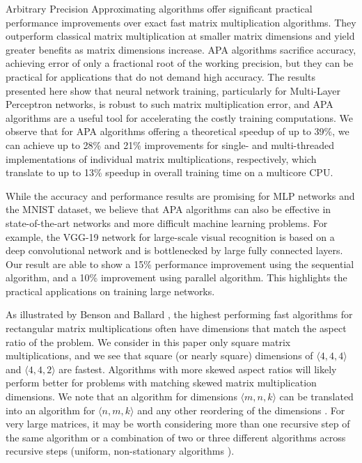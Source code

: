 \documentclass[manuscript]{acmart}
\newcommand{\dims}[1]{\langle #1 \rangle}
\begin{document}
Arbitrary Precision Approximating algorithms offer significant practical performance improvements over exact fast matrix multiplication algorithms.
They outperform classical matrix multiplication at smaller matrix dimensions and yield greater benefits as matrix dimensions increase.
APA algorithms sacrifice accuracy, achieving error of only a fractional root of the working precision, but they can be practical for applications that do not demand high accuracy.
The results presented here show that neural network training, particularly for Multi-Layer Perceptron networks, is robust to such matrix multiplication error, and APA algorithms are a useful tool for accelerating the costly training computations.
We observe that for APA algorithms offering a theoretical speedup of up to 39\%, we can achieve up to 28\% and 21\% improvements for single- and multi-threaded implementations of individual matrix multiplications, respectively, which translate to up to 13\% speedup in overall training time on a multicore CPU.

While the accuracy and performance results are promising for MLP networks and the MNIST dataset, we believe that APA algorithms can also be effective in state-of-the-art networks and more difficult machine learning problems.
For example, the VGG-19 network for large-scale visual recognition \cite{SZ15} is based on a deep convolutional network and is bottlenecked by large fully connected layers.
Our result are able to show a 15\% performance improvement using the sequential algorithm, and a 10\% improvement using parallel algorithm.
This highlights the practical applications on training large networks.

As illustrated by Benson and Ballard \cite{BB15}, the highest performing fast algorithms for rectangular matrix multiplications often have dimensions that match the aspect ratio of the problem.
We consider in this paper only square matrix multiplications, and we see that square (or nearly square) dimensions of $\dims{4,4,4}$ and $\dims{4,4,2}$ are fastest.
Algorithms with more skewed aspect ratios will likely perform better for problems with matching skewed matrix multiplication dimensions.
We note that an algorithm for dimensions $\dims{m,n,k}$ can be translated into an algorithm for $\dims{n,m,k}$ and any other reordering of the dimensions \cite{BB15}.
For very large matrices, it may be worth considering more than one recursive step of the same algorithm or a combination of two or three different algorithms across recursive steps (uniform, non-stationary algorithms \cite{BBDLS16}).
\end{document}
